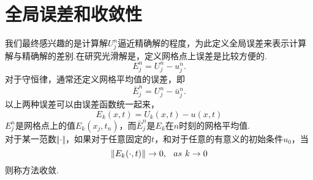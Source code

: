 \section{全局误差和收敛性}
我们最终感兴趣的是计算解$U_j^n$逼近精确解的程度，为此定义全局误差来表示计算解与精确解的差别.在研究光滑解是，定义网格点上误差是比较方便的.
\begin{equation}
	E_j^n = U_j^n - u_j^n.
\end{equation}
对于守恒律，通常还定义网格平均值的误差，即
\begin{equation}
	\bar{E}_j^n = U_j^n - \bar{u}_j^n.
\end{equation}
以上两种误差可以由误差函数统一起来，
\begin{equation}
	E_k(x,t) = U_k(x,t) - u(x,t)
\end{equation}
$E_j^n$是网格点上的值$E_k(x_j,t_n)$，而$\bar{E}_j^n$是$E_k$在$n$时刻的网格平均值.\\
对于某一范数$\Vert\cdot\Vert$，如果对于任意固定的$t$，和对于任意的有意义的初始条件$u_0$，当
\begin{equation}
	\Vert E_k(\cdot,t) \Vert \to 0, \hspace{0.1in} as \hspace{0.05in} k \to 0
\end{equation}
则称方法收敛.

